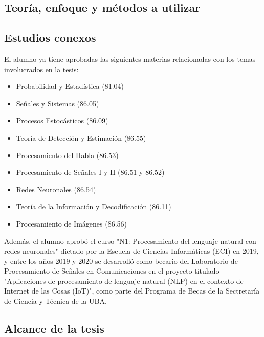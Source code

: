 
\subsection{Teoría, enfoque y métodos a utilizar}



\subsection{Estudios conexos}

El alumno ya tiene aprobadas las siguientes materias relacionadas con los temas involucrados en la tesis:
\begin{itemize}
    \item Probabilidad y Estadística (81.04)
    \item Señales y Sistemas (86.05)
    \item Procesos Estocásticos (86.09)
    \item Teoría de Detección y Estimación (86.55)
    \item Procesamiento del Habla (86.53)
    \item Procesamiento de Señales I y II (86.51 y 86.52)
    \item Redes Neuronales (86.54)
    \item Teoría de la Información y Decodificación (86.11)
    \item Procesamiento de Imágenes (86.56)
\end{itemize}

Además, el alumno aprobó el curso "N1: Procesamiento del lenguaje natural con redes neuronales" dictado por la Escuela de Ciencias Informáticas (ECI) en 2019, y entre los años 2019 y 2020 se desarrolló como becario del Laboratorio de Procesamiento de Señales en Comunicaciones en el proyecto titulado "Aplicaciones de procesamiento de lenguaje natural (NLP) en el contexto de Internet de las Cosas (IoT)", como parte del Programa de Becas de la Sectretaría de Ciencia y Técnica de la UBA. 

\subsection{Alcance de la tesis}

